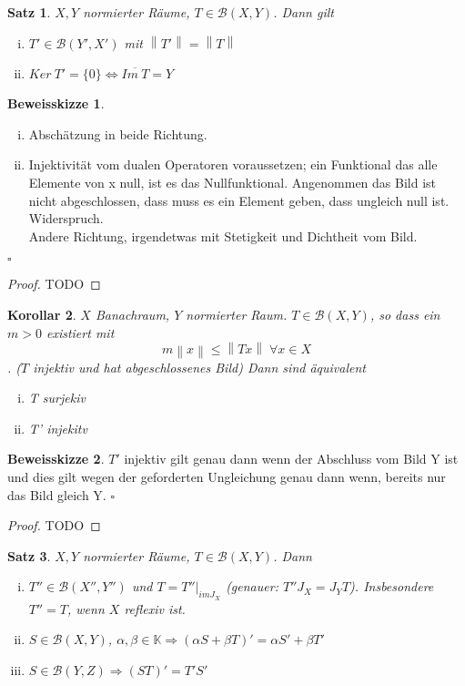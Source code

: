 \documentclass[ngerman]{report}
\theoremstyle{plain}%
\newtheorem{thm}{Satz}[chapter]
\newtheorem{cor}[thm]{Korollar}
\theoremstyle{definition}%
\theoremstyle{myStyle}
\newtheorem*{proof*}{Beweisskizze}
\newenvironment{hinweise}{\footnotesize \begin{proof*}}{\hfill $\square$ \end{proof*}\normalsize}
\newcommand{\K}{\mathbb{K}}
\newcommand{\B}{\mathcal{B}} %
\newcommand{\BS}[1][X,Y]{\mathcal{B}(#1)} %
\newcommand{\norm}[1]{\left \|#1\right\| }
\newcommand{\df}[1][]{%
	\overset{#1}{\Rightarrow}
}
\newcommand{\aq}{\Leftrightarrow} %
\newcommand{\set}[1]{\{#1\}} %
\begin{document}
	\begin{thm}
		$X, Y$ normierter Räume, $T\in \BS$. Dann gilt 
			\begin{enumerate}[(i)]
				\item $T' \in \B(Y', X')$ mit $\norm{T'} = \norm{T}$
				\item $Ker\: T' = \set{0} \aq \overline{Im\: T} = Y$
			\end{enumerate}
	\end{thm}

	\begin{hinweise}
		\begin{enumerate}[(i)]
			\item Abschätzung in beide Richtung.
			\item Injektivität vom dualen Operatoren voraussetzen; ein Funktional das alle Elemente von x null, ist es das Nullfunktional. Angenommen das Bild ist nicht abgeschlossen, dass muss es ein Element geben, dass ungleich null ist. Widerspruch. \\
			Andere Richtung, irgendetwas mit Stetigkeit und Dichtheit vom Bild.
		\end{enumerate}
	\end{hinweise}

	\begin{proof}
		TODO
	\end{proof}

	\begin{cor}
		$X$ Banachraum, $Y$ normierter Raum. $T\in \BS$, so dass ein $m > 0$ existiert mit 
			$$m \norm{x} \leq \norm{Tx} \; \forall x \in X$$. ($T$ injektiv und hat abgeschlossenes Bild)
			Dann sind äquivalent 
						\begin{enumerate}[(i)]
							\item T surjekiv
							\item T' injekitv
						\end{enumerate}
	\end{cor}

	\begin{hinweise}
		$T'$ injektiv gilt genau dann wenn der Abschluss vom Bild Y ist und dies gilt wegen der geforderten Ungleichung genau dann wenn, bereits nur das Bild gleich Y.
	\end{hinweise}

	\begin{proof}
		TODO
	\end{proof}

	\begin{thm}
		$X, Y$ normierter Räume, $T\in \BS$. Dann
				\begin{enumerate}[(i)]
					\item $T'' \in \B(X'',Y'')$ und $T = T''|_{imJ_X}$ (genauer: $T''J_X = J_Y T$). Insbesondere $T'' = T$, wenn $X$ reflexiv ist.
					\item $S\in \BS$, $\alpha, \beta \in \K \df (\alpha S + \beta T)' = \alpha S' + \beta T'$
					\item $S\in \B(Y,Z) \df (ST)' = T' S'$
				\end{enumerate}
	\end{thm}
\end{document}

